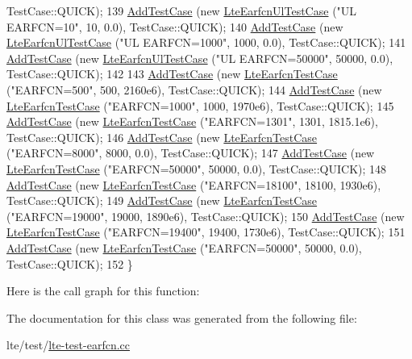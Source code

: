 \begin{DoxyCode}
      TestCase::QUICK);
139   \hyperlink{classns3_1_1TestCase_a3718088e3eefd5d6454569d2e0ddd835}{AddTestCase} (\textcolor{keyword}{new} \hyperlink{classLteEarfcnUlTestCase}{LteEarfcnUlTestCase} (\textcolor{stringliteral}{"UL EARFCN=10"}, 10, 0.0), 
      TestCase::QUICK);
140   \hyperlink{classns3_1_1TestCase_a3718088e3eefd5d6454569d2e0ddd835}{AddTestCase} (\textcolor{keyword}{new} \hyperlink{classLteEarfcnUlTestCase}{LteEarfcnUlTestCase} (\textcolor{stringliteral}{"UL EARFCN=1000"}, 1000, 0.0), 
      TestCase::QUICK);
141   \hyperlink{classns3_1_1TestCase_a3718088e3eefd5d6454569d2e0ddd835}{AddTestCase} (\textcolor{keyword}{new} \hyperlink{classLteEarfcnUlTestCase}{LteEarfcnUlTestCase} (\textcolor{stringliteral}{"UL EARFCN=50000"}, 50000, 0.0), 
      TestCase::QUICK);
142 
143   \hyperlink{classns3_1_1TestCase_a3718088e3eefd5d6454569d2e0ddd835}{AddTestCase} (\textcolor{keyword}{new} \hyperlink{classLteEarfcnTestCase}{LteEarfcnTestCase} (\textcolor{stringliteral}{"EARFCN=500"}, 500, 2160e6), 
      TestCase::QUICK);
144   \hyperlink{classns3_1_1TestCase_a3718088e3eefd5d6454569d2e0ddd835}{AddTestCase} (\textcolor{keyword}{new} \hyperlink{classLteEarfcnTestCase}{LteEarfcnTestCase} (\textcolor{stringliteral}{"EARFCN=1000"}, 1000, 1970e6), 
      TestCase::QUICK);
145   \hyperlink{classns3_1_1TestCase_a3718088e3eefd5d6454569d2e0ddd835}{AddTestCase} (\textcolor{keyword}{new} \hyperlink{classLteEarfcnTestCase}{LteEarfcnTestCase} (\textcolor{stringliteral}{"EARFCN=1301"}, 1301, 1815.1e6), 
      TestCase::QUICK);
146   \hyperlink{classns3_1_1TestCase_a3718088e3eefd5d6454569d2e0ddd835}{AddTestCase} (\textcolor{keyword}{new} \hyperlink{classLteEarfcnTestCase}{LteEarfcnTestCase} (\textcolor{stringliteral}{"EARFCN=8000"}, 8000, 0.0), 
      TestCase::QUICK);
147   \hyperlink{classns3_1_1TestCase_a3718088e3eefd5d6454569d2e0ddd835}{AddTestCase} (\textcolor{keyword}{new} \hyperlink{classLteEarfcnTestCase}{LteEarfcnTestCase} (\textcolor{stringliteral}{"EARFCN=50000"}, 50000, 0.0), 
      TestCase::QUICK);
148   \hyperlink{classns3_1_1TestCase_a3718088e3eefd5d6454569d2e0ddd835}{AddTestCase} (\textcolor{keyword}{new} \hyperlink{classLteEarfcnTestCase}{LteEarfcnTestCase} (\textcolor{stringliteral}{"EARFCN=18100"}, 18100, 1930e6), 
      TestCase::QUICK);
149   \hyperlink{classns3_1_1TestCase_a3718088e3eefd5d6454569d2e0ddd835}{AddTestCase} (\textcolor{keyword}{new} \hyperlink{classLteEarfcnTestCase}{LteEarfcnTestCase} (\textcolor{stringliteral}{"EARFCN=19000"}, 19000, 1890e6), 
      TestCase::QUICK);
150   \hyperlink{classns3_1_1TestCase_a3718088e3eefd5d6454569d2e0ddd835}{AddTestCase} (\textcolor{keyword}{new} \hyperlink{classLteEarfcnTestCase}{LteEarfcnTestCase} (\textcolor{stringliteral}{"EARFCN=19400"}, 19400, 1730e6), 
      TestCase::QUICK);
151   \hyperlink{classns3_1_1TestCase_a3718088e3eefd5d6454569d2e0ddd835}{AddTestCase} (\textcolor{keyword}{new} \hyperlink{classLteEarfcnTestCase}{LteEarfcnTestCase} (\textcolor{stringliteral}{"EARFCN=50000"}, 50000, 0.0), 
      TestCase::QUICK);
152 \}
\end{DoxyCode}


Here is the call graph for this function\+:




The documentation for this class was generated from the following file\+:\begin{DoxyCompactItemize}
\item 
lte/test/\hyperlink{lte-test-earfcn_8cc}{lte-\/test-\/earfcn.\+cc}\end{DoxyCompactItemize}

